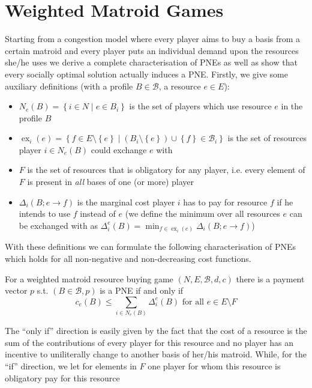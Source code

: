 \documentclass{scrartcl}
\theoremstyle{nonumberplain}
\newcommand{\tupel}[1]{\left(#1\right)}
\newcommand{\set}[1]{\left\{#1\right\}}
\DeclareMathOperator{\ex}{ex}
\begin{document}
\section{Weighted Matroid Games}
Starting from a congestion model where every player aims to buy a basis from
a certain matroid and every player puts an individual demand upon the resources
she/he uses we derive a complete characterisation of PNEs as well as show that
every socially optimal solution actually induces a PNE. Firstly, we give some
auxiliary definitions (with a profile $B\in\mathcal{B}$, a resource $e\in E$):
\begin{itemize}
  \item $N_{e}(B) = \set{i\in N\middle| e\in B_{i}}$ is the set of players
    which use resource $e$ in the profile $B$
  \item $\ex_{i}(e) = \set{f\in E\setminus\set{e}\middle|
    (B_{i}\setminus\set{e})\cup\set{f}\in\mathcal{B}_{i}}$ is the set of
    resources player $i\in N_{e}(B)$ could exchange $e$ with
  \item $F$ is the set of resources that is obligatory for any player, i.e.
    every element of $F$ is present in \emph{all} bases of one (or more) player
  \item $\Delta_{i}\tupel{B;e\rightarrow f}$ is the marginal cost player $i$
    has to pay for resource $f$ if he intends to use $f$ instead of $e$
    (we define the minimum over all resources $e$ can be exchanged with as
    $\Delta_{i}^{e}(B) = \min_{f\in\ex_{i}(e)}\Delta_{i}(B;e\rightarrow f)$)
\end{itemize}
With these definitions we can formulate the following characterisation of
PNEs which holds for all non-negative and non-decreasing cost functions.
\begin{theo}
  For a weighted matroid resource buying game $\tupel{N, E, \mathcal{B}, d, c}$
  there is a payment vector $p$ s.t. $\tupel{B\in\mathcal{B}, p}$ is a PNE
  if and only if
  \begin{equation*}
    c_{e}(B)\leq\sum_{i\in N_{e}(B)}\Delta_{i}^{e}(B) \text{ for all } e\in
    E\setminus F
  \end{equation*}
\end{theo}
The \enquote{only if} direction is easily given by the fact that the cost
of a resource is the sum of the contributions of every player for this resource
and no player has an incentive to uniliterally change to another basis of
her/his matroid. While, for the \enquote{if} direction, we let for elements in
$F$ one player for whom this resource is obligatory pay for this resource
\end{document}
